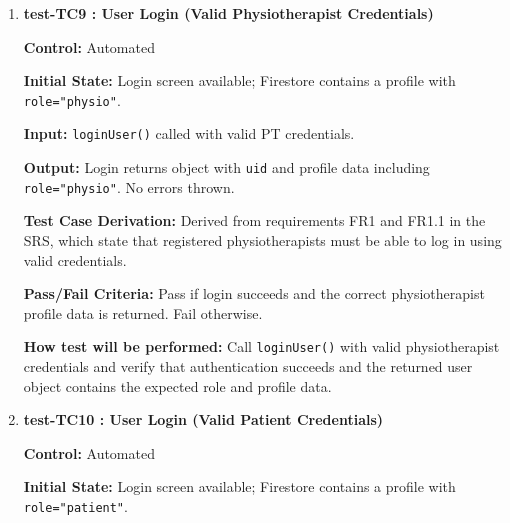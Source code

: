 \documentclass[12pt, titlepage]{article}
\begin{document}
\begin{enumerate}
	\textbf{Output:} Error ``Invite code missing physio link'' thrown. No Auth user or Firestore writes created.
	
	\textbf{Test Case Derivation:} Derived from requirements FR1.1, FR1.3, and FR2 in the SRS, which require that patient accounts must be linked to a physiotherapist through a valid invite code.
	
	\textbf{Pass/Fail Criteria:} Pass if the missing link case is rejected and no account data is created. Fail otherwise.
	
	\textbf{How test will be performed:} Call \texttt{registerPatient()} with an invite code that lacks a \texttt{physioId} and verify that the system throws the correct error and rejects registration.
	
	
	\vspace{0.5em}
	
	\item \textbf{test-TC9 : User Login (Valid Physiotherapist Credentials)}
	
	\textbf{Control:} Automated
	
	\textbf{Initial State:} Login screen available; Firestore contains a profile with \texttt{role="physio"}.
	
	\textbf{Input:} \texttt{loginUser()} called with valid PT credentials.
	
	\textbf{Output:} Login returns object with \texttt{uid} and profile data including \texttt{role="physio"}. No errors thrown.
	
	\textbf{Test Case Derivation:} Derived from requirements FR1 and FR1.1 in the SRS, which state that registered physiotherapists must be able to log in using valid credentials.
	
	\textbf{Pass/Fail Criteria:} Pass if login succeeds and the correct physiotherapist profile data is returned. Fail otherwise.
	
	\textbf{How test will be performed:} Call \texttt{loginUser()} with valid physiotherapist credentials and verify that authentication succeeds and the returned user object contains the expected role and profile data.
	
	
	\vspace{0.5em}
	
	\item \textbf{test-TC10 : User Login (Valid Patient Credentials)}
	
	\textbf{Control:} Automated
	
	\textbf{Initial State:} Login screen available; Firestore contains a profile with \texttt{role="patient"}.
	

\end{enumerate}
\end{document}
